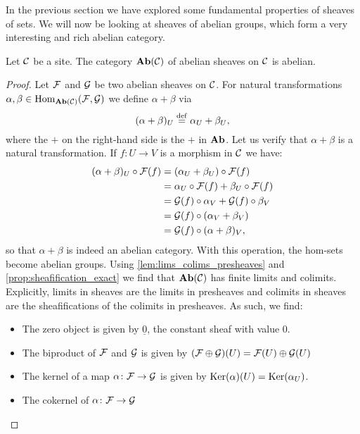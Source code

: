 \documentclass{article}
\begin{document}
In the previous section we have explored some
fundamental properties of sheaves of sets.
We will now be looking at sheaves of abelian groups,
which form a very interesting and rich abelian category.
\begin{prop}
    Let $\mathcal{C}$ be a site. The category
    $\operatorname{\mathbf{Ab}}(\mathcal{C})$ of abelian sheaves on $\mathcal{C}$ is abelian.
\end{prop}
\begin{proof}
    Let $\mathcal{F}$ and $\mathcal{G}$ be two abelian sheaves on $\mathcal{C}$.
    For natural transformations $\alpha, \beta \in \operatorname{Hom}_{\operatorname{\mathbf{Ab}}(\mathcal{C})}(\mathcal{F}, \mathcal{G})$
    we define $\alpha + \beta$ via
    \begin{equation*}
        (\alpha + \beta)_U \overset{\mathrm{def}}{=} \alpha_U + \beta_U,
    \end{equation*}
    where the $+$ on the right-hand side is the $+$ in $\operatorname{\mathbf{Ab}}$.
    Let us verify that $\alpha + \beta$ is a natural transformation.
    If $f\colon U \to V$ is a morphism in $\mathcal{C}$ we have:
    \begin{align*}
        (\alpha + \beta)_U \circ \mathcal{F}(f)
         & = (\alpha_U + \beta_U) \circ \mathcal{F}(f)             \\
         & = \alpha_U \circ \mathcal{F}(f) + \beta_U \circ \mathcal{F}(f) \\
         & = \mathcal{G}(f) \circ \alpha_V + \mathcal{G}(f) \circ \beta_V \\
         & = \mathcal{G}(f) \circ (\alpha_V + \beta_V)             \\
         & = \mathcal{G}(f) \circ (\alpha + \beta)_V,
    \end{align*}
    so that $\alpha + \beta$ is indeed an abelian category.
    With this operation, the hom-sets become abelian groups.
    Using \cref{lem:lims_colims_presheaves} and \cref{prop:sheafification_exact}
    we find that $\operatorname{\mathbf{Ab}}(\mathcal{C})$ has finite limits and colimits.
    Explicitly, limits in sheaves are the limits in presheaves
    and colimits in sheaves are the sheafifications of the colimits in presheaves.
    As such, we find:
    \begin{itemize}
        \item The zero object is given by $\underline{0}$,
              the constant sheaf with value $0$.
        \item The biproduct of $\mathcal{F}$ and $\mathcal{G}$ is given by
              $(\mathcal{F} \oplus \mathcal{G} )(U) = \mathcal{F}(U) \oplus \mathcal{G}(U)$
        \item The kernel of a map $\alpha \colon \mathcal{F} \to \mathcal{G}$ is given by
              $\operatorname{Ker}(\alpha)(U) = \operatorname{Ker}(\alpha_U)$.
        \item The cokernel of $\alpha \colon \mathcal{F} \to \mathcal{G}$

\end{itemize}
\end{proof}
\end{document}
